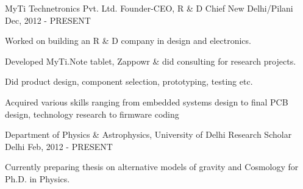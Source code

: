 

\begin{cventries}

  \cventry
    {MyTi Technetronics Pvt. Ltd.} %
    {Founder-CEO, R \& D Chief} %
    {New Delhi/Pilani} %
    {Dec, 2012 - PRESENT} %
    {
      \begin{cvitems} %
        \item {Worked on building an R \& D company in design and electronics.}
        \item {Developed MyTi.Note tablet, Zappowr \& did consulting for research projects.}
        \item {Did product design, component selection, prototyping, testing etc.}
        \item {Acquired various skills ranging from embedded systems design to final PCB design, technology research to firmware coding}
      \end{cvitems}
    }

    \cventry
    {Department of Physics \& Astrophysics, University of Delhi} %
    {Research Scholar} %
    {Delhi} %
    {Feb, 2012 - PRESENT} %
    {
    \begin{cvitems} 
      \item {Currently preparing thesis on alternative models of gravity and Cosmology for Ph.D. in Physics.}
    \end{cvitems}
    }
    

\end{cventries}
